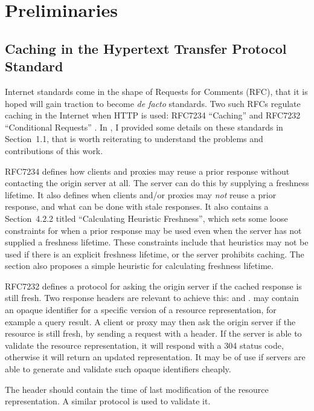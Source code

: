 \section{Preliminaries}

\subsection{Caching in the Hypertext Transfer Protocol Standard}\label{sec:httpcache}

Internet standards come in the shape of Requests for Comments (RFC),
that it is hoped will gain traction to become \textit{de facto}
standards. Two such RFCs regulate caching in the Internet when HTTP is
used: RFC7234 ``Caching'' \cite{rfc7234} and RFC7232 ``Conditional
Requests'' \cite{rfc7232}. In \cite{kjernsmo_survey_2015}, I provided
some details on these standards in Section~1.1, that is worth
reiterating to understand the problems and contributions of this
work. 

RFC7234 defines how clients and proxies may reuse a prior response
without contacting the origin server at all. The server can do this by
supplying a freshness lifetime. It also defines when clients and/or
proxies may \emph{not} reuse a prior response, and what can be done
with stale responses. It also contains a Section~4.2.2 titled
``Calculating Heuristic Freshness'', which sets some loose constraints
for when a prior response may be used even when the server has not
supplied a freshness lifetime. These constraints include that
heuristics may not be used if there is an explicit freshness lifetime,
or the server prohibits caching. The section also proposes a simple
heuristic for calculating freshness lifetime.

RFC7232 defines a protocol for asking the origin server if the cached
response is still fresh. Two response headers are relevant to achieve
this:  and .   may
contain an opaque identifier for a specific version of a resource
representation, for example a query result. A client or proxy may then
ask the origin server if the resource is still fresh, by sending a
request with a  header. If the server is able to
validate the resource representation, it will respond with a 304
status code, otherwise it will return an updated representation. It
may be of use if servers are able to generate and validate such opaque
identifiers cheaply.

The  header should contain the time of last
modification of the resource representation. A similar protocol is
used to validate it.
